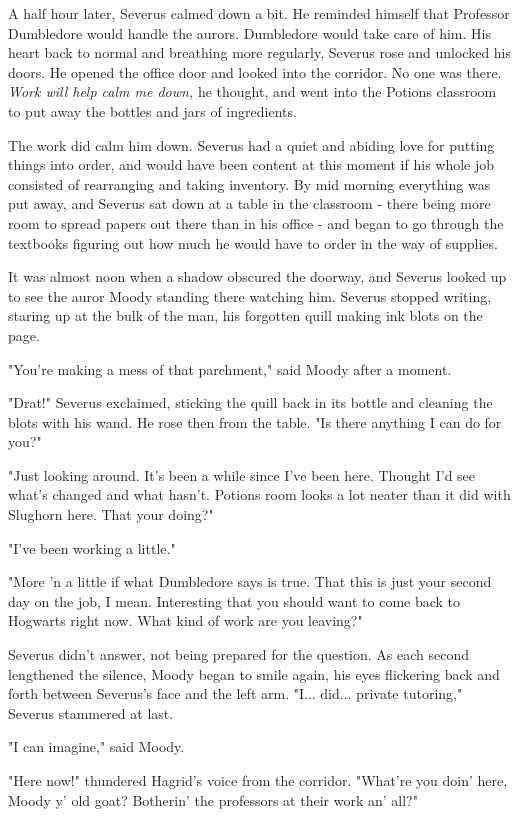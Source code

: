 \documentclass[a4paper,11pt]{article}
\begin{document}
A half hour later, Severus calmed down a bit. He reminded himself that Professor Dumbledore would handle the aurors. Dumbledore would take care of him. His heart back to normal and breathing more regularly, Severus rose and unlocked his doors. He opened the office door and looked into the corridor. No one was there. \emph{Work will help calm me down,} he thought, and went into the Potions classroom to put away the bottles and jars of ingredients.

The work did calm him down. Severus had a quiet and abiding love for putting things into order, and would have been content at this moment if his whole job consisted of rearranging and taking inventory. By mid morning everything was put away, and Severus sat down at a table in the classroom - there being more room to spread papers out there than in his office - and began to go through the textbooks figuring out how much he would have to order in the way of supplies.

It was almost noon when a shadow obscured the doorway, and Severus looked up to see the auror Moody standing there watching him. Severus stopped writing, staring up at the bulk of the man, his forgotten quill making ink blots on the page.

"You're making a mess of that parchment," said Moody after a moment.

"Drat!" Severus exclaimed, sticking the quill back in its bottle and cleaning the blots with his wand. He rose then from the table. "Is there anything I can do for you?"

"Just looking around. It's been a while since I've been here. Thought I'd see what's changed and what hasn't. Potions room looks a lot neater than it did with Slughorn here. That your doing?"

"I've been working a little."

"More 'n a little if what Dumbledore says is true. That this is just your second day on the job, I mean. Interesting that you should want to come back to Hogwarts right now. What kind of work are you leaving?"

Severus didn't answer, not being prepared for the question. As each second lengthened the silence, Moody began to smile again, his eyes flickering back and forth between Severus's face and the left arm. "I... did... private tutoring," Severus stammered at last.

"I can imagine," said Moody.

"Here now!" thundered Hagrid's voice from the corridor. "What're you doin' here, Moody y' old goat? Botherin' the professors at their work an' all?"
\end{document}
